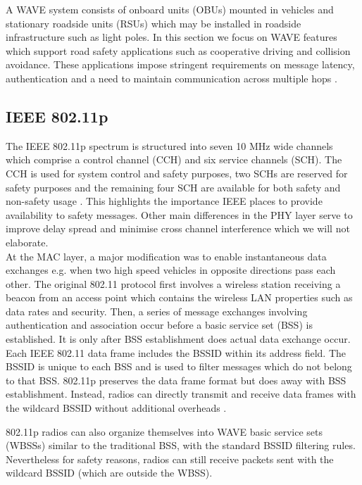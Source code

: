 
A WAVE system consists of onboard units (OBUs) mounted in vehicles and stationary roadside units (RSUs) which may be installed in roadside infrastructure such as light poles. In this section we focus on WAVE features which support road safety applications such as cooperative driving and collision avoidance. These applications impose stringent requirements on message latency, authentication and a need to maintain communication across multiple hops \cite{raya2007securing} \cite{uzcategui2009wave}.

\subsection{IEEE 802.11p}

The IEEE 802.11p spectrum is structured into seven 10 MHz wide channels which comprise a control channel (CCH) and six service channels (SCH). The CCH is used for system control and safety purposes, two SCHs are reserved for safety purposes and the remaining four SCH are available for both safety and non-safety usage \cite{jiang2008ieee}. This highlights the importance IEEE places to provide availability to safety messages. Other main differences in the PHY layer serve to improve delay spread and minimise cross channel interference which we will not elaborate.\\

At the MAC layer, a major modification was to enable instantaneous data exchanges e.g. when two high speed vehicles in opposite directions pass each other. The original 802.11 protocol first involves a wireless station receiving a beacon from an access point which contains the wireless LAN properties such as data rates and security. Then, a series of message exchanges involving authentication and association occur before a basic service set (BSS) is established. It is only after BSS establishment does actual data exchange occur. \\

Each IEEE 802.11 data frame includes the BSSID within its address field. The BSSID is unique to each BSS and is used to filter messages which do not belong to that BSS. 802.11p preserves the data frame format but does away with BSS establishment. Instead, radios can directly transmit and receive data frames with the wildcard BSSID without additional overheads \cite{jiang2008ieee}.

802.11p radios can also organize themselves into WAVE basic service sets (WBSSs) similar to the traditional BSS, with the standard BSSID filtering rules. Nevertheless for safety reasons, radios can still receive packets sent with the wildcard BSSID (which are outside the WBSS).

